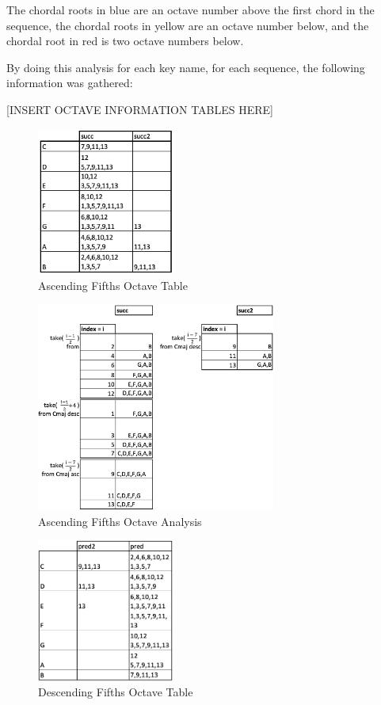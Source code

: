 \documentclass{report}
\begin{document}
The chordal roots in blue are an octave number above the first chord in the sequence,  the chordal roots in yellow are an octave number below, and the chordal  root in red is two octave numbers below.

By doing this analysis for each key name, for each sequence, the following information was gathered:

[INSERT OCTAVE INFORMATION TABLES HERE]
\begin{figure}[h!]
\centering
\includegraphics[width=0.4\textwidth]{images/asc_fifths_octave_grid}
  \caption{Ascending Fifths Octave Table}
\end{figure}

\begin{figure}[h!]
\centering
\includegraphics[width=0.7\textwidth]{images/asc_fifths_octave_analysis}
  \caption{Ascending Fifths Octave Analysis}
\end{figure}


\begin{figure}[h!]
\centering
\includegraphics[width=0.4\textwidth]{images/desc_fifths_octave_grid}
  \caption{Descending Fifths Octave Table}
\end{figure}
\end{document}

